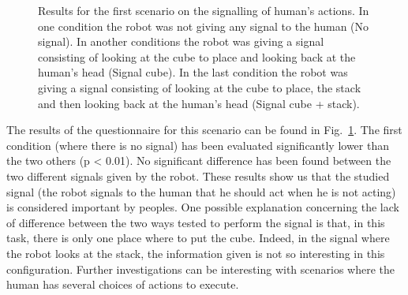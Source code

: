 \documentclass[english,a4paper,11pt,twoside]{StyleThese}
\begin{document}
\begin{figure}[!h]
\centering
    \caption{Results for the first scenario on the signalling of human's actions. In one condition the robot was not giving any signal to the human (No signal). In another conditions the robot was giving a signal consisting of looking at the cube to place and looking back at the human's head (Signal cube). In the last condition the robot was giving a signal consisting of looking at the cube to place, the stack and then looking back at the human's head (Signal cube + stack).}
    \label{fig:resSce4}
\end{figure}

The results of the questionnaire for this scenario can be found in Fig.~\ref{fig:resSce4}. The first condition (where there is no signal) has been evaluated significantly lower than the two others (p < 0.01). No significant difference has been found between the two different signals given by the robot. These results show us that the studied signal (the robot signals to the human that he should act when he is not acting) is considered important by peoples. One possible explanation concerning the lack of difference between the two ways tested to perform the signal is that, in this task, there is only one place where to put the cube. Indeed, in the signal where the robot looks at the stack, the information given is not so interesting in this configuration. Further investigations can be interesting with scenarios where the human has several choices of actions to execute.
\end{document}
